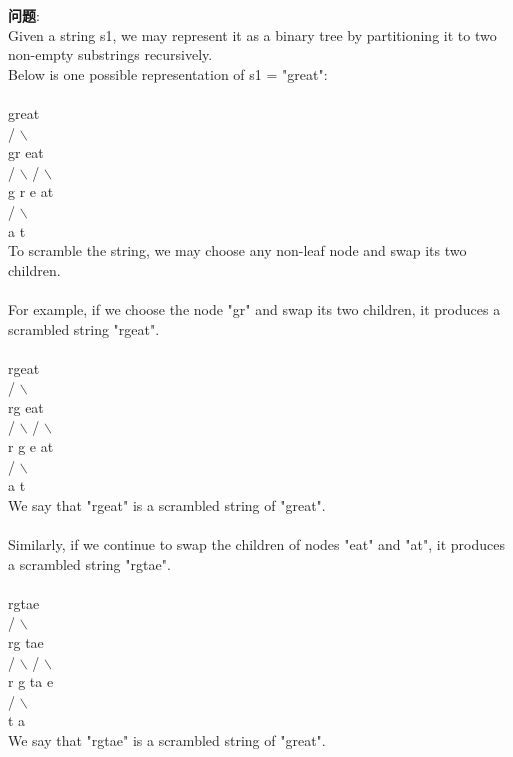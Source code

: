     
\begin{description}
    \item{\textbf{问题}}:\\
Given a string s1, we may represent it as a binary tree by partitioning it to two non-empty substrings recursively.\\
Below is one possible representation of s1 = "great":\\
\\
    great\\
   /     $\backslash$ \\
  gr    eat \\
 /  $\backslash$    /   $\backslash$ \\
g   r  e   at \\
           /  $\backslash$ \\
          a   t \\
To scramble the string, we may choose any non-leaf node and swap its two children. \\
\\
For example, if we choose the node "gr" and swap its two children, it produces a scrambled string "rgeat".\\
\\
    rgeat \\
   /     $\backslash$ \\
  rg    eat \\
 /  $\backslash$    /   $\backslash$ \\
r   g  e   at \\
           /  $\backslash$ \\
          a   t \\
We say that "rgeat" is a scrambled string of "great".\\
\\
Similarly, if we continue to swap the children of nodes "eat" and "at", it produces a scrambled string "rgtae".\\
\\
    rgtae\\
   /     $\backslash$ \\
  rg    tae \\
 /  $\backslash$    /   $\backslash$ \\
r   g  ta  e \\
       /  $\backslash$ \\
      t   a \\
We say that "rgtae" is a scrambled string of "great". \\
\\

\end{description}
